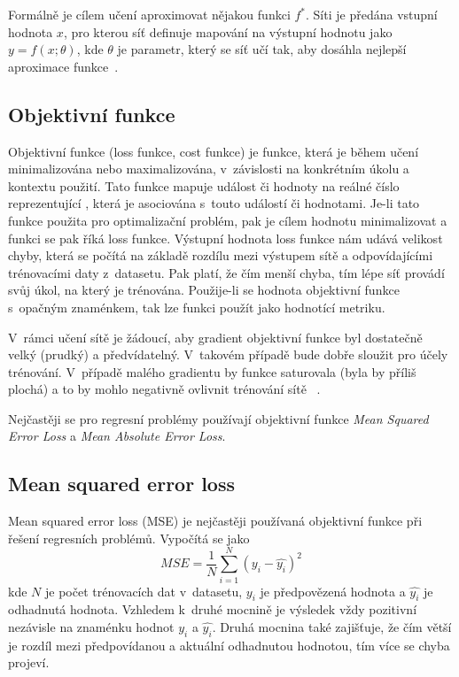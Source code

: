 Formálně je cílem učení aproximovat nějakou funkci $f^\ast$. Síti je předána vstupní hodnota $x$, pro kterou síť definuje mapování na výstupní hodnotu jako $y = f(x; \theta)$, kde $\theta$ je parametr, který se síť učí tak, aby dosáhla nejlepší aproximace funkce~\cite{mitdeeplearning}.


\subsection{Objektivní funkce}
Objektivní funkce (loss funkce, cost funkce) je funkce, která je během učení minimalizována nebo maximalizována, v~závislosti na konkrétním úkolu a kontextu použití. Tato funkce mapuje událost či hodnoty na reálné číslo reprezentující , která je asociována s~touto událostí či hodnotami. Je-li tato funkce použita pro optimalizační problém, pak je cílem hodnotu minimalizovat a funkci se pak říká loss funkce. Výstupní hodnota loss funkce nám udává velikost chyby, která se počítá na základě rozdílu mezi výstupem sítě a odpovídajícími trénovacími daty z~datasetu. Pak platí, že čím menší chyba, tím lépe síť provádí svůj úkol, na který je trénována. Použije-li se hodnota objektivní funkce s~opačným znaménkem, tak lze funkci použít jako hodnotící metriku.


V~rámci učení sítě je žádoucí, aby gradient objektivní funkce byl dostatečně velký (prudký) a předvídatelný. V~takovém případě bude dobře sloužit pro účely trénování. V~případě malého gradientu by funkce saturovala (byla by příliš plochá) a to by mohlo negativně ovlivnit trénování sítě~ \cite{mitdeeplearning}. 

Nejčastěji se pro regresní problémy používají objektivní funkce \textit{Mean Squared Error Loss} a \textit{Mean Absolute Error Loss}.


\subsection*{Mean squared error loss}
Mean squared error loss (MSE) je nejčastěji používaná objektivní funkce při řešení regresních problémů. Vypočítá se jako
\begin{equation}
  MSE = \frac{1}{N}\sum_{i=1}^N(y_i - \hat{y_i})^2
\end{equation}
kde $N$ je počet trénovacích dat v~datasetu, $y_i$ je předpovězená hodnota a $\hat{y_i}$ je odhadnutá hodnota. Vzhledem k~druhé mocnině je výsledek vždy pozitivní nezávisle na znaménku hodnot $y_i$ a $\hat{y_i}$. Druhá mocnina také zajišťuje, že čím větší je rozdíl mezi předpovídanou a aktuální odhadnutou hodnotou, tím více se chyba projeví. 

